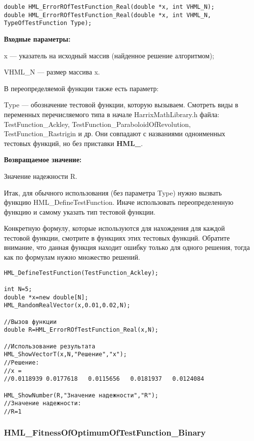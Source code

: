 \documentclass[a4paper,12pt]{article}
\begin{document}
\begin{lstlisting}[label=code_syntax_HML_ErrorROfTestFunction_Real,caption=Синтаксис]
double HML_ErrorROfTestFunction_Real(double *x, int VHML_N);
double HML_ErrorROfTestFunction_Real(double *x, int VHML_N, TypeOfTestFunction Type);
\end{lstlisting}

\textbf{Входные параметры:}

x --- указатель на исходный массив (найденное решение алгоритмом);

VHML\_N --- размер массива x.

В переопределяемой функции также есть параметр:
  
Type --- обозначение тестовой функции, которую вызываем.
Смотреть виды в переменных перечисляемого типа в начале HarrixMathLibrary.h файла: TestFunction\_Ackley, TestFunction\_ParaboloidOfRevolution, TestFunction\_Rastrigin и др. Они совпадают с названиями одноименных тестовых функций, но без приставки \textbf{HML\_}.

\textbf{Возвращаемое значение:}
 
Значение надежности R.

Итак, для обычного использования (без параметра Type) нужно вызвать функцию HML\_DefineTestFunction. Иначе использовать переопределенную функцию и самому указать тип тестовой функции.

Конкретную формулу, которые используются для нахождения для каждой тестовой функции, смотрите в функциях этих тестовых функций. Обратите внимание, что данная функция находит ошибку только для одного решения, тогда как по формулам нужно множество решений.


\begin{lstlisting}[label=code_use_HML_ErrorROfTestFunction_Real,caption=Пример использования]
HML_DefineTestFunction(TestFunction_Ackley);

int N=5;
double *x=new double[N];
HML_RandomRealVector(x,0.01,0.02,N);

//Вызов функции
double R=HML_ErrorROfTestFunction_Real(x,N);

//Использование результата
HML_ShowVectorT(x,N,"Решение","x");
//Решение:
//x =
//0.0118939	0.0177618	0.0115656	0.0181937	0.0124084

HML_ShowNumber(R,"Значение надежности","R");
//Значение надежности:
//R=1
\end{lstlisting}

\subsubsection{HML\_FitnessOfOptimumOfTestFunction\_Binary}\label{HML_FitnessOfOptimumOfTestFunction_Binary}
\end{document}
